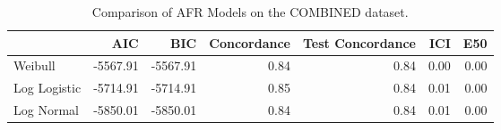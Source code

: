 \begin{table*}
\centering
\caption{Comparison of AFR Models on the COMBINED dataset.}
\label{tab:combined}
\begin{tabular}{lrrrrrr}
\toprule
 & AIC & BIC & Concordance & Test Concordance & ICI & E50 \\
\midrule
Weibull & -5567.91 & -5567.91 & 0.84 & 0.84 & 0.00 & 0.00 \\
Log Logistic & -5714.91 & -5714.91 & 0.85 & 0.84 & 0.01 & 0.00 \\
Log Normal & -5850.01 & -5850.01 & 0.84 & 0.84 & 0.01 & 0.00 \\
\bottomrule
\end{tabular}
\end{table*}
